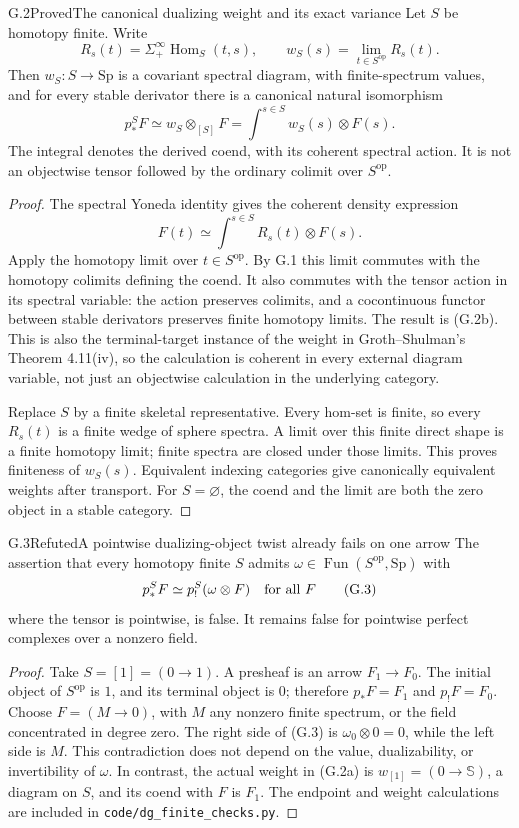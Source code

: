 \begin{claim}{G.2}{Proved}{The canonical dualizing weight and its exact variance}
Let $S$ be homotopy finite. Write
\[
 R_s(t)=\Sigma^\infty_+\operatorname{Hom}_S(t,s),\qquad
 w_S(s)=\lim_{t\in S^{\mathrm{op}}}R_s(t).
\tag{G.2a}
\]
Then $w_S:S\to\mathrm{Sp}$ is a covariant spectral diagram, with
finite-spectrum values, and for every stable derivator there is a
canonical natural isomorphism
\[
 p_*^S F\simeq w_S\otimes_{[S]}F
       =\int^{s\in S} w_S(s)\otimes F(s).
\tag{G.2b}
\]
The integral denotes the derived coend, with its coherent spectral
action. It is not an objectwise tensor followed by the ordinary
colimit over $S^{\mathrm{op}}$.
\end{claim}
\begin{proof}
The spectral Yoneda identity gives the coherent density expression
\[
 F(t)\simeq\int^{s\in S}R_s(t)\otimes F(s).
\]
Apply the homotopy limit over $t\in S^{\mathrm{op}}$. By G.1 this
limit commutes with the homotopy colimits defining the coend. It also
commutes with the tensor action in its spectral variable: the action
preserves colimits, and a cocontinuous functor between stable
derivators preserves finite homotopy limits. The result is (G.2b).
This is also the terminal-target instance of the weight in
Groth--Shulman's Theorem 4.11(iv), so the calculation is coherent in
every external diagram variable, not just an objectwise calculation
in the underlying category.

Replace $S$ by a finite skeletal representative. Every hom-set is
finite, so every $R_s(t)$ is a finite wedge of sphere spectra. A limit
over this finite direct shape is a finite homotopy limit; finite
spectra are closed under those limits. This proves finiteness of
$w_S(s)$. Equivalent indexing categories give canonically equivalent
weights after transport. For $S=\varnothing$, the coend and the limit
are both the zero object in a stable category.
\end{proof}

\begin{claim}{G.3}{Refuted}{A pointwise dualizing-object twist already fails on one arrow}
The assertion that every homotopy finite $S$ admits
$\omega\in\operatorname{Fun}(S^{\mathrm{op}},\mathrm{Sp})$ with
\[
 p_*^SF\simeq p_!^S(\omega\otimes F)
 \quad\hbox{for all }F
\tag{G.3}
\]
where the tensor is pointwise, is false. It remains false for
pointwise perfect complexes over a nonzero field.
\end{claim}
\begin{proof}
Take $S=[1]=(0\to1)$. A presheaf is an arrow $F_1\to F_0$.
The initial object of $S^{\mathrm{op}}$ is $1$, and its terminal
object is $0$; therefore $p_*F=F_1$ and $p_!F=F_0$.
Choose $F=(M\to0)$, with $M$ any nonzero finite spectrum, or the
field concentrated in degree zero. The right side of (G.3) is
$\omega_0\otimes0=0$, while the left side is $M$. This contradiction
does not depend on the value, dualizability, or invertibility of
$\omega$. In contrast, the actual weight in (G.2a) is
$w_{[1]}=(0\to\mathbb S)$, a diagram on $S$, and its coend with
$F$ is $F_1$. The endpoint and weight calculations are included in
\texttt{code/dg\_finite\_checks.py}.
\end{proof}

